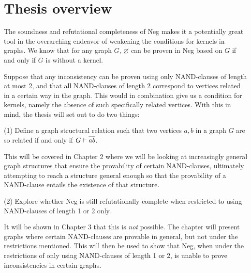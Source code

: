 \section{Thesis overview}
\label{sec:Thesis overview}
The soundness and refutational completeness of Neg makes it a potentially great tool in the overarching endeavor of weakening the conditions for kernels in graphs.
We know that for any graph $G$, $\varnothing$ can be proven in Neg based on $G$ if and only if $G$ is without a kernel.

Suppose that any inconsistency can be proven using only NAND-clauses of length at most 2, and that all NAND-clauses of length 2 correspond to vertices related in a certain way in the graph.
This would in combination give us a condition for kernels, namely the absence of such specifically related vertices.
With this in mind, the thesis will set out to do two things:

(1) Define a graph structural relation such that two vertices $a,b$ in a graph $G$ are so related if and only if $G \vdash \ol{ab}$.

This will be covered in Chapter 2 where we will be looking at increasingly general graph structures that ensure the provability of certain NAND-clauses, ultimately attempting to reach a structure general enough so that the provability of a NAND-clause entails the existence of that structure.

(2) Explore whether Neg is still refutationally complete when restricted to using NAND-clauses of length 1 or 2 only.

It will be shown in Chapter 3 that this is \textit{not} possible.
The chapter will present graphs where certain NAND-clauses are provable in general, but not under the restrictions mentioned.
This will then be used to show that Neg, when under the restrictions of only using NAND-clauses of length 1 or 2, is unable to prove inconsistencies in certain graphs.
